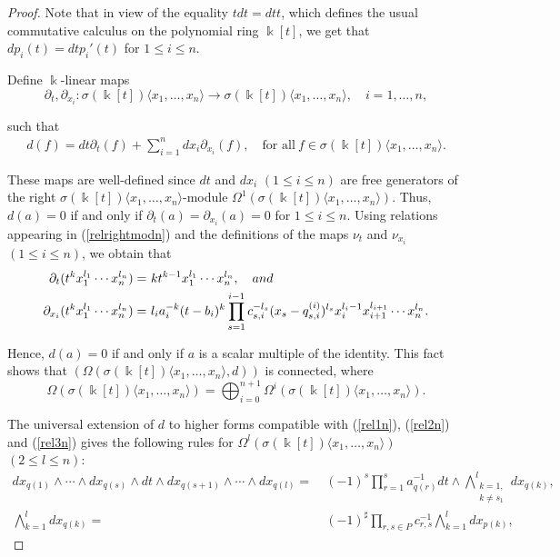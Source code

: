 \documentclass{amsart}
\theoremstyle{definition}
\theoremstyle{remark}
\numberwithin{equation}{section}
\begin{document}
\begin{proof}
Note that in view of the equality $t dt = dt t$, which defines the usual commutative calculus on the polynomial ring $\Bbbk[t]$, we get that $dp_i(t) = dtp_i'(t)$ for $1 \leq i \leq n$.

Define $\Bbbk$-linear maps 
$$
\partial_t, \partial_{x_i}: \sigma(\Bbbk[t])\langle x_1,\ldots, x_n\rangle \rightarrow \sigma(\Bbbk[t])\langle x_1,\ldots, x_n\rangle, \quad i = 1, \dotsc, n,
$$ 

such that
\begin{align*}
    d(f)=dt\partial_t(f) + \sum_{i=1}^{n}dx_i\partial_{x_i}(f), \quad \text{for all}\ f \in \sigma(\Bbbk[t])\langle x_1,\ldots, x_n\rangle.
\end{align*}

These maps are well-defined since $dt$ and $dx_i$ $(1\leq i \leq n)$ are free generators of the right $\sigma(\Bbbk[t])\langle x_1,\ldots, x_n\rangle$-module $\Omega^1(\sigma(\Bbbk[t])\langle x_1,\ldots, x_n\rangle)$. Thus, $d(a)=0$ if and only if $\partial_t(a)=\partial_{x_i}(a)=0$ for $1 \leq i \leq n$. Using relations appearing in {\rm (}\ref{relrightmodn}{\rm )} and the definitions of the maps $\nu_t$ and $\nu_{x_i}$ $(1 \leq i \leq n)$, we obtain that
\begin{align}
    \partial_t(t^kx_1^{l_1} \dotsb x_n^{l_n}) = &\ kt^{k-1}x_1^{l_1}\cdots x_n^{l_n}, \quad {\rm and} \\
    \partial_{x_i}(t^kx_1^{l_1}\cdots x_n^{l_n}) = &\ l_{i}a_i^{-k}(t-b_i)^k\prod_{s=1}^{i-1}c_{s,i}^{-l_s}(x_s-q_{s,i}^{(i)})^{l_s} x_i^{l_i-1}x_{i+1}^{l_{i+1}}\cdots x_n^{l_n}. \notag
\end{align}

Hence, $d(a)=0$ if and only if $a$ is a scalar multiple of the identity. This fact shows that $(\Omega(\sigma(\Bbbk[t])\langle x_1,\ldots, x_n\rangle,d))$ is connected, where 
$$
\Omega (\sigma(\Bbbk[t])\langle x_1,\ldots, x_n\rangle) = \bigoplus_{i=0}^{n+1}\Omega^i (\sigma(\Bbbk[t])\langle x_1,\ldots, x_n\rangle).
$$

The universal extension of $d$ to higher forms compatible with {\rm (}\ref{rel1n}{\rm )}, {\rm (}\ref{rel2n}{\rm )} and {\rm (}\ref{rel3n}{\rm )} gives the following rules for $\Omega^l (\sigma(\Bbbk[t])\langle x_1,\ldots, x_n\rangle)$ $(2\leq l \leq n)$: 
\begin{align}
    dx_{q(1)}\wedge \dotsb \wedge dx_{q(s)}\wedge dt \wedge dx_{q(s+1)}\wedge \dotsb \wedge dx_{q(l)} = &\ (-1)^s\prod_{r=1}^{s} a_{q(r)}^{-1} dt \wedge \bigwedge_{\substack{k=1,\\k \ne s_1}}^{l}dx_{q(k)}, \label{relnos1}  \\
    \bigwedge_{k=1}^{l}dx_{q(k)} = &\ (-1)^{\sharp}\prod_{r,s\in P}c_{r,s}^{-1}\bigwedge_{k=1}^ldx_{p(k)}, 
\end{align}


\end{proof}
\end{document}
